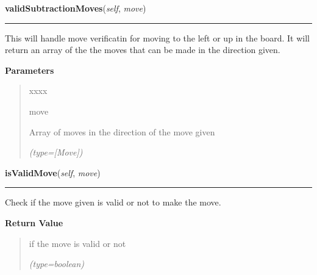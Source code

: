 \hspace{.8\funcindent}\begin{boxedminipage}{\funcwidth}

    \raggedright \textbf{validSubtractionMoves}(\textit{self}, \textit{move})

    \vspace{-1.5ex}

    \rule{\textwidth}{0.5\fboxrule}
\setlength{\parskip}{2ex}
    This will handle move verificatin for moving to the left or up in the 
    board. It will return an array of the the moves that can be made in the
    direction given.

\setlength{\parskip}{1ex}
      \textbf{Parameters}
      \vspace{-1ex}

      \begin{quote}
        \begin{Ventry}{xxxx}

          \item[move]

          Array of moves in the direction of the move given

            {\it (type=[Move])}

        \end{Ventry}

      \end{quote}

    \end{boxedminipage}

    \label{UnBlockMeSolver:Map:Map:Map:isValidMove}

    \vspace{0.5ex}

\hspace{.8\funcindent}\begin{boxedminipage}{\funcwidth}

    \raggedright \textbf{isValidMove}(\textit{self}, \textit{move})

    \vspace{-1.5ex}

    \rule{\textwidth}{0.5\fboxrule}
\setlength{\parskip}{2ex}
    Check if the move given is valid or not to make the move.

\setlength{\parskip}{1ex}
      \textbf{Return Value}
    \vspace{-1ex}

      \begin{quote}
      if the move is valid or not

      {\it (type=boolean)}

      \end{quote}

    \end{boxedminipage}


